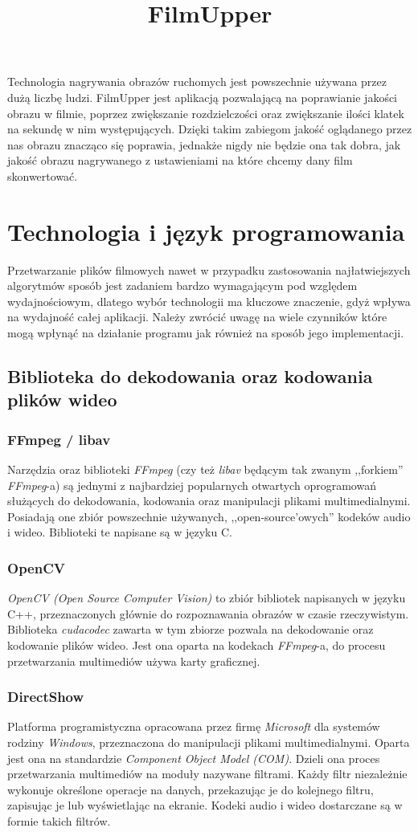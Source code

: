 \documentclass[twoside]{projektInzynierskiMS}
\title{FilmUpper}
\begin{document}
Technologia nagrywania obrazów ruchomych jest powszechnie używana przez dużą liczbę ludzi.
FilmUpper jest aplikacją pozwalającą na poprawianie jakości obrazu w filmie, poprzez zwiększanie rozdzielczości oraz zwiększanie ilości klatek na sekundę w nim występujących. Dzięki takim zabiegom jakość oglądanego przez nas obrazu znacząco się poprawia, jednakże nigdy nie będzie ona tak dobra, jak jakość obrazu nagrywanego z ustawieniami na które chcemy dany film skonwertować. 



\section{Technologia i język programowania}


Przetwarzanie plików filmowych nawet w przypadku zastosowania najłatwiejszych algorytmów sposób jest zadaniem bardzo wymagającym pod względem wydajnościowym, dlatego wybór technologii ma kluczowe znaczenie, gdyż wpływa na wydajność całej aplikacji. Należy zwrócić uwagę na wiele czynników które mogą wpłynąć na działanie programu jak również na sposób jego implementacji.

\subsection{Biblioteka do dekodowania oraz kodowania plików wideo}

\subsubsection{FFmpeg / libav}
Narzędzia oraz biblioteki \emph{FFmpeg} (czy też \emph{libav} będącym tak zwanym ,,forkiem'' \emph{FFmpeg}-a) są jednymi z najbardziej popularnych otwartych oprogramowań służących do dekodowania, kodowania oraz manipulacji plikami multimedialnymi. Posiadają one zbiór powszechnie używanych, ,,open-source'owych'' kodeków audio i wideo. Biblioteki te napisane są w języku C. 
\subsubsection{OpenCV}
\emph{OpenCV (Open Source Computer Vision)} to zbiór bibliotek napisanych w języku C++, przeznaczonych głównie do rozpoznawania obrazów w czasie rzeczywistym. Biblioteka \emph{cudacodec} zawarta w tym zbiorze pozwala na dekodowanie oraz kodowanie plików wideo. Jest ona oparta na kodekach \emph{FFmpeg}-a, do procesu przetwarzania multimediów używa karty graficznej.
\subsubsection{DirectShow}
Platforma programistyczna opracowana przez firmę \emph{Microsoft} dla systemów rodziny \emph{Windows}, przeznaczona do manipulacji plikami multimedialnymi. Oparta jest ona na standardzie \emph{Component Object Model (COM)}. Dzieli ona proces przetwarzania multimediów na moduły nazywane filtrami. Każdy filtr niezależnie wykonuje określone operacje na danych, przekazując je do kolejnego filtru, zapisując je lub wyświetlając na ekranie. Kodeki audio i wideo dostarczane są w formie takich filtrów.
\end{document}
